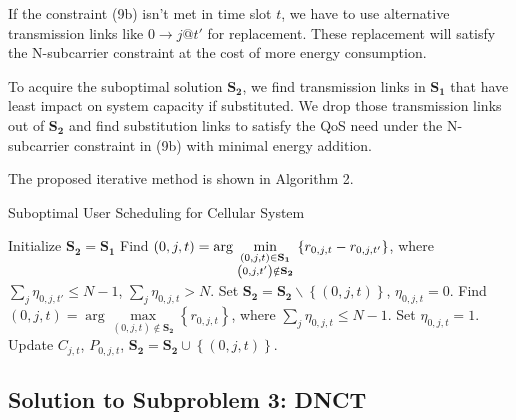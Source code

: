 \documentclass{ieeeaccess}
\begin{document}
If the constraint (9b) isn't met in time slot ${t}$, we have to use alternative transmission links like $0 \to j@t'$ for replacement. These replacement will satisfy the N-subcarrier constraint at the cost of more energy consumption. 

To acquire the suboptimal solution ${{\mathbf{S}}_{\mathbf{2}}}$, we find transmission links in ${{\mathbf{S}}_{\mathbf{1}}}$ that have least impact on system capacity if substituted. We drop those transmission links out of ${{\mathbf{S}}_{\mathbf{2}}}$ and find substitution links to satisfy the QoS need under the N-subcarrier constraint in (9b) with minimal energy addition. 

The proposed iterative method is shown in Algorithm 2.

\begin{algorithm}[h]
\caption{Suboptimal User Scheduling for Cellular System}
\label{alg:1}
\begin{algorithmic}[1]
\STATE Initialize ${{\mathbf{S}}_{\mathbf{2}}}={{\mathbf{S}}_{\mathbf{1}}}$
  \STATE Find $\left( {0,j,t} \right) = \arg \mathop {\min }\limits_{\scriptstyle \left( {0,j,t} \right) \in {{\mathbf{S}}_{\mathbf{1}}} \atop
  \scriptstyle \left( {0,j,t'} \right) \notin {{\mathbf{S}}_{\mathbf{2}}}}  \left\{ {{r_{0,j,t}} - {r_{0,j,t'}}} \right\}$, where $\sum\limits_{j} {{\eta _{0,j,t'}}}  \le N - 1$, $\sum\limits_j {{\eta _{0,j,t}} > N} $.
  \STATE Set ${{\mathbf{S}}_{\mathbf{2}}}={{\mathbf{S}}_{\mathbf{2}}}\backslash \left\{ {\left( {0,j,t} \right)} \right\}$, ${\eta _{0,j,t}} = 0$.
    \STATE Find ${\left( {0,j,t} \right) = \arg \mathop {\max }\limits_{\left( {0,j,t} \right) \notin {{\mathbf{S}}_{\mathbf{2}}}} \left\{ {{r_{0,j,t}}} \right\}}$, where ${\sum\limits_j {{\eta _{0,j,t}}}  \le N - 1}$.
    \STATE Set ${\eta _{0,j,t}} = 1$.
    \STATE Update ${C_{j,t}}$, ${P_{0,j,t}}$, ${{\mathbf{S}}_{\mathbf{2}}}={{\mathbf{S}}_{\mathbf{2}}} \cup \left\{ {\left( {0,j,t} \right)} \right\}$.
  \ENDWHILE
\ENDWHILE
\end{algorithmic}
\end{algorithm}

\subsection{Solution to \textbf{Subproblem 3: DNCT}}
\end{document}
